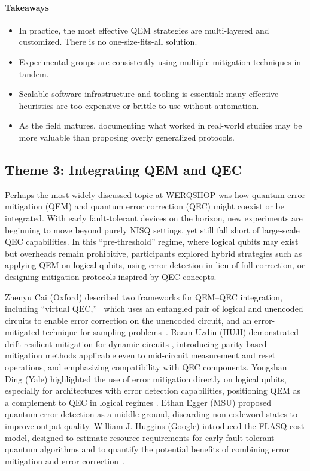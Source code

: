 \documentclass{article}
\begin{document}
\paragraph{Takeaways}
\begin{itemize}
    \item In practice, the most effective QEM strategies are multi-layered and customized. There is no one-size-fits-all solution.
    \item Experimental groups are consistently using multiple mitigation techniques in tandem.
    \item Scalable software infrastructure and tooling is essential: many effective heuristics are too expensive or brittle to use without automation.
    \item As the field matures, documenting what worked in real-world studies may be more valuable than proposing overly generalized protocols.
\end{itemize}

\subsection*{Theme 3: Integrating QEM and QEC}

Perhaps the most widely discussed topic at WERQSHOP was how quantum error mitigation (QEM) and quantum error correction (QEC) might coexist or be integrated.
With early fault-tolerant devices on the horizon, new experiments are beginning to move beyond purely NISQ settings, yet still fall short of large-scale QEC capabilities.
In this ``pre-threshold'' regime, where logical qubits may exist but overheads remain prohibitive, participants explored hybrid strategies such as applying QEM on logical qubits, using error detection in lieu of full correction, or designing mitigation protocols inspired by QEC concepts.

Zhenyu Cai (Oxford) described two frameworks for QEM–QEC integration, including ``virtual QEC,''~\cite{cai2024} which uses an entangled pair of logical and unencoded circuits to enable error correction on the unencoded circuit, and an error-mitigated technique for sampling problems~\cite{cai2025}.
Raam Uzdin (HUJI) demonstrated drift-resilient mitigation for dynamic circuits \cite{santos2025driftresilientmidcircuitmeasurementerror}, introducing parity-based mitigation methods applicable even to mid-circuit measurement and reset operations, and emphasizing compatibility with QEC components.
Yongshan Ding (Yale) highlighted the use of error mitigation directly on logical qubits, especially for architectures with error detection capabilities, positioning QEM as a complement to QEC in logical regimes \cite{zhou2025surfacecodeerrorcorrection}.
Ethan Egger (MSU) proposed quantum error detection as a middle ground, discarding non-codeword states to improve output quality.
William J. Huggins (Google) introduced the FLASQ cost model, designed to estimate resource requirements for early fault-tolerant quantum algorithms and to quantify the potential benefits of combining error mitigation and error correction~\cite{lacroix2025scaling}.
\end{document}
